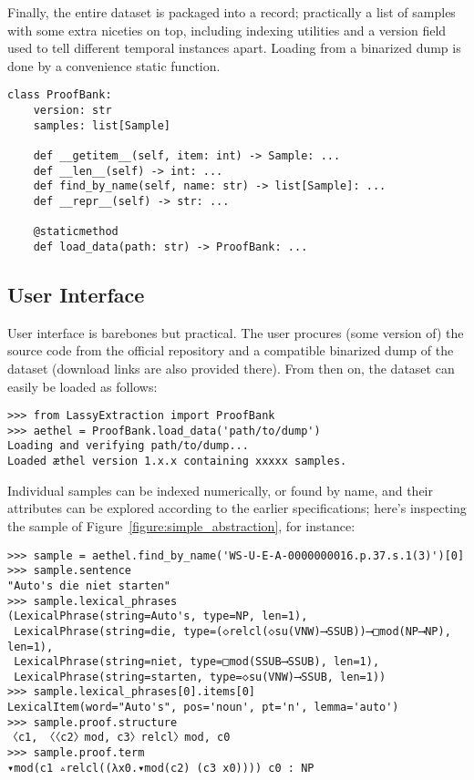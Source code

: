 \noindent Finally, the entire dataset is packaged into a  record; practically a list of samples with some extra niceties on top, including indexing utilities and a version field used to tell different temporal instances apart.
Loading from a binarized dump is done by a convenience static function.

\begin{verbatim}
class ProofBank:
    version: str
    samples: list[Sample]

    def __getitem__(self, item: int) -> Sample: ...
    def __len__(self) -> int: ...
    def find_by_name(self, name: str) -> list[Sample]: ...
    def __repr__(self) -> str: ...

    @staticmethod
    def load_data(path: str) -> ProofBank: ...
\end{verbatim}

\subsection{User Interface}
User interface is barebones but practical.
The user procures (some version of) the source code from the official repository and a compatible binarized dump of the dataset (download links are also provided there).
From then on, the dataset can easily be loaded as follows:

\begin{verbatim}
>>> from LassyExtraction import ProofBank
>>> aethel = ProofBank.load_data('path/to/dump')
Loading and verifying path/to/dump...
Loaded æthel version 1.x.x containing xxxxx samples.
\end{verbatim}

\noindent Individual samples can be indexed numerically, or found by name, and their attributes can be explored according to the earlier specifications; here's inspecting the sample of Figure~\ref{figure:simple_abstraction}, for instance:

\begin{verbatim}
>>> sample = aethel.find_by_name('WS-U-E-A-0000000016.p.37.s.1(3)')[0]
>>> sample.sentence
"Auto's die niet starten"
>>> sample.lexical_phrases
(LexicalPhrase(string=Auto's, type=NP, len=1),
 LexicalPhrase(string=die, type=(◇relcl(◇su(VNW)⟶SSUB))⟶□mod(NP⟶NP), len=1),
 LexicalPhrase(string=niet, type=□mod(SSUB⟶SSUB), len=1),
 LexicalPhrase(string=starten, type=◇su(VNW)⟶SSUB, len=1))
>>> sample.lexical_phrases[0].items[0]
LexicalItem(word="Auto's", pos='noun', pt='n', lemma='auto')
>>> sample.proof.structure
〈c1, 〈〈c2〉mod, c3〉relcl〉mod, c0
>>> sample.proof.term
▾mod(c1 ▵relcl((λx0.▾mod(c2) (c3 x0)))) c0 : NP
\end{verbatim}

